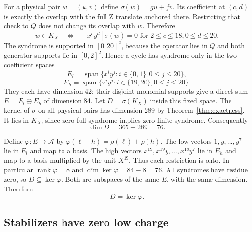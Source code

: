 \documentclass{article}
\DeclareMathOperator{\rank}{rank}
\DeclareMathOperator{\Span}{span}
\begin{document}
For a physical pair \(w=(u,v)\) define
\(\sigma(w)=gu+fv\). Its coefficient at \((c,d)\) is exactly the overlap
with the full Z translate anchored there. Restricting that check to \(Q\)
does not change its overlap with \(w\). Therefore
\begin{equation}
  w\in K_X \quad\Longleftrightarrow\quad
  [x^cy^d]\sigma(w)=0
  \text{ for } 2\le c\le 18, 0\le d\le 20.
\end{equation}
The syndrome is supported in \([0,20]^2\), because the operator lies in
\(Q\) and both generator supports lie in \([0,2]^2\).
Hence a cycle has syndrome only in the two coefficient spaces
\begin{equation}
  E_l=\Span\{x^iy^j:i\in\{0,1\}, 0\le j\le 20\},
\end{equation}
\begin{equation}
  E_h=\Span\{x^iy^j:i\in\{19,20\}, 0\le j\le 20\}.
\end{equation}
They each have dimension 42; their disjoint monomial supports give a
direct sum \(E=E_l\oplus E_h\) of dimension 84.
Let \(D=\sigma(K_X)\) inside this fixed space.
The kernel of \(\sigma\) on all physical pairs has dimension 289 by
Theorem~\ref{thm:exactness}. It lies in \(K_X\), since zero full syndrome
implies zero finite syndrome. Consequently
\begin{equation}
  \dim D=365-289=76.
\end{equation}

Define \(\varphi\colon E\to\mathcal{A}\) by
\(\varphi(\ell+h)=\rho(\ell)+\rho(h)\).
The low vectors \(1,y,\dots,y^7\) lie in \(E_l\) and map to a basis.
The high vectors \(x^{19},x^{19}y,\dots,x^{19}y^7\) lie in \(E_h\) and
map to a basis multiplied by the unit \(X^{19}\). Thus each restriction
is onto. In particular \(\rank\varphi=8\) and \(\dim\ker\varphi=84-8=76\).
All syndromes have residue zero, so \(D\subseteq\ker\varphi\).
Both are subspaces of the same \(E\), with the same dimension. Therefore
\begin{equation}
  D=\ker\varphi.
\end{equation}

\subsection{Stabilizers have zero low charge}\label{sec:x-stabilizers}
\end{document}
